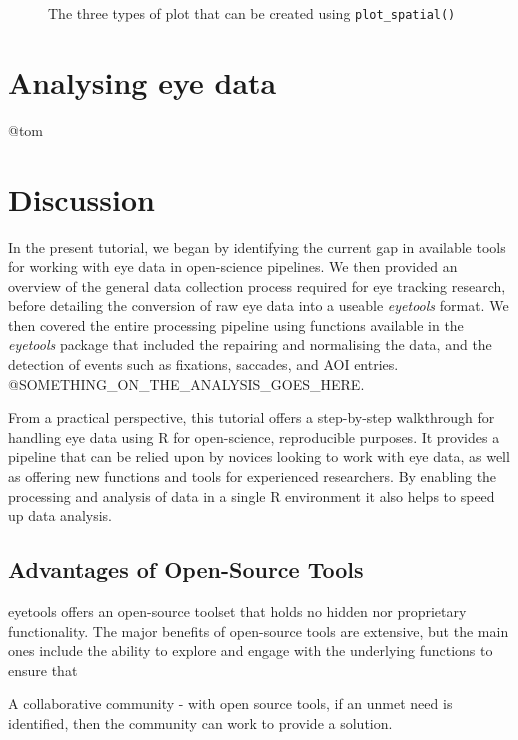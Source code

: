 \documentclass[
  man,
  floatsintext,
  longtable,
  nolmodern,
  notxfonts,
  notimes,
  colorlinks=true,linkcolor=blue,citecolor=blue,urlcolor=blue]{apa7}
\begin{document}
\begin{figure}[H]

\caption{\label{fig-spatial}The three types of plot that can be created
using \texttt{plot\_spatial()}}

\end{figure}%

\section{Analysing eye data}\label{analysing-eye-data}

@tom

\section{Discussion}\label{discussion}

In the present tutorial, we began by identifying the current gap in
available tools for working with eye data in open-science pipelines. We
then provided an overview of the general data collection process
required for eye tracking research, before detailing the conversion of
raw eye data into a useable \emph{eyetools} format. We then covered the
entire processing pipeline using functions available in the
\emph{eyetools} package that included the repairing and normalising the
data, and the detection of events such as fixations, saccades, and AOI
entries. @SOMETHING\_ON\_THE\_ANALYSIS\_GOES\_HERE.

From a practical perspective, this tutorial offers a step-by-step
walkthrough for handling eye data using R for open-science, reproducible
purposes. It provides a pipeline that can be relied upon by novices
looking to work with eye data, as well as offering new functions and
tools for experienced researchers. By enabling the processing and
analysis of data in a single R environment it also helps to speed up
data analysis.

\subsection{Advantages of Open-Source
Tools}\label{advantages-of-open-source-tools}

eyetools offers an open-source toolset that holds no hidden nor
proprietary functionality. The major benefits of open-source tools are
extensive, but the main ones include the ability to explore and engage
with the underlying functions to ensure that

A collaborative community - with open source tools, if an unmet need is
identified, then the community can work to provide a solution.
\end{document}
